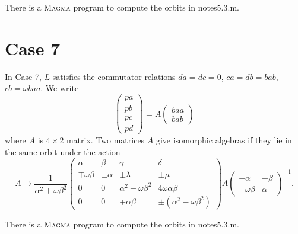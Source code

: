 \documentclass[12pt]{article}
\begin{document}
There is a \textsc{Magma} program to compute the orbits in notes5.3.m.

\section{Case 7}

In Case 7, $L$ satisfies the commutator relations $da=dc=0$, $ca=db=bab$, $%
cb=\omega baa$. We write%
\[
\left( 
\begin{array}{c}
pa \\ 
pb \\ 
pc \\ 
pd%
\end{array}%
\right) =A\left( 
\begin{array}{c}
baa \\ 
bab%
\end{array}%
\right) 
\]%
where $A$ is $4\times 2$ matrix. Two matrices $A$ give isomorphic algebras
if they lie in the same orbit under the action%
\[
A\rightarrow \frac{1}{\alpha ^{2}+\omega \beta ^{2}}\left( 
\begin{array}{cccc}
\alpha & \beta & \gamma & \delta \\ 
\mp \omega \beta & \pm \alpha & \pm \lambda & \pm \mu \\ 
0 & 0 & \alpha ^{2}-\omega \beta ^{2} & 4\omega \alpha \beta \\ 
0 & 0 & \mp \alpha \beta & \pm (\alpha ^{2}-\omega \beta ^{2})%
\end{array}%
\right) A\left( 
\begin{array}{cc}
\pm \alpha & \pm \beta \\ 
-\omega \beta & \alpha%
\end{array}%
\right) ^{-1}. 
\]

There is a \textsc{Magma} program to compute the orbits in notes5.3.m.
\end{document}
